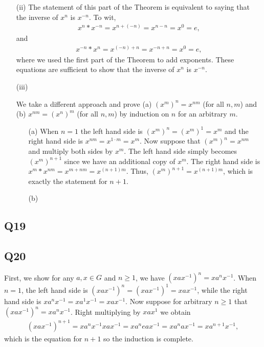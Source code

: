 \documentclass[12pt]{article}
\numberwithin{theorem}{section}
\numberwithin{equation}{section}
\numberwithin{remark}{section}
\numberwithin{definition}{section}
\numberwithin{theorem}{section}
\numberwithin{lemma}{section}
\numberwithin{example}{section}
\begin{document}
\begin{itemize}
	\item[(ii)]{The statement of this part of the Theorem is equivalent to saying that the inverse of $x^n$ is $x^{-n}$. To wit,
	\begin{align*}
		x^n * x^{-n} = x^{n+(-n)}=x^{n-n}=x^0=e,
	\end{align*}
	and
	\begin{align*}
		x^{-n} * x^n = x^{(-n)+n}=x^{-n+n}=x^0=e,
	\end{align*}
	where we used the first part of the Theorem to add exponents. These equations are sufficient to show that the inverse of $x^n$ is $x^{-n}$.}
	\item[(iii)]{We take a different approach and prove (a) $(x^m)^n=x^{nm}$ (for all $n,m$) and (b) $x^{nm}=(x^n)^m$ (for all $n,m$) by induction on $n$ for an arbitrary $m$.
	\begin{itemize}
		\item[(a)]{When $n=1$ the left hand side is $(x^m)^n=(x^m)^1=x^m$ and the right hand side is $x^{nm}=x^{1\cdot m}=x^m$. Now suppose that $(x^m)^n=x^{nm}$ and multiply both sides by $x^m$. The left hand side simply becomes $(x^m)^{n+1}$ since we have an additional copy of $x^m$. The right hand side is $x^m*x^{nm}=x^{m+nm}=x^{(n+1)m}$. Thus, $(x^m)^{n+1}=x^{(n+1)m}$, which is exactly the statement for $n+1$.}
		\item[(b)]{}
	\end{itemize}}
\end{itemize}

\subsection{Q19}

\subsection{Q20}

First, we show for any $a,x\in G$ and $n\ge 1$, we have $(xax^{-1})^n=xa^nx^{-1}$. When $n=1$, the left hand side is $(xax^{-1})^n=(xax^{-1})^1=xax^{-1}$, while the right hand side is $xa^nx^{-1}=xa^1x^{-1}=xax^{-1}$. Now suppose for arbitrary $n\ge1$ that $(xax^{-1})^n=xa^nx^{-1}$. Right multiplying by $xax^{1}$ we obtain
\begin{align*}
	(xax^{-1})^{n+1}=xa^nx^{-1}xax^{-1}=xa^neax^{-1}=xa^nax^{-1}=xa^{n+1}x^{-1},
\end{align*}
which is the equation for $n+1$ so the induction is complete. 
\end{document}
